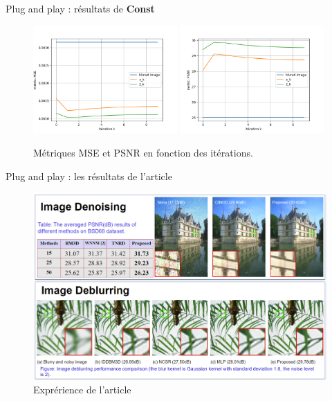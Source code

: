\documentclass[11pt]{beamer}
\begin{document}
\begin{frame}{Plug and play : résultats de \textbf{Const}}
    \begin{figure}[b]
        \centering
        \includegraphics[width=0.49\textwidth]{../images/hqs_constant/MSE.png}
        \includegraphics[width=0.49\textwidth]{../images/hqs_constant/PSNR.png}
        \caption{Métriques MSE et PSNR en fonction des itérations.}
    \end{figure}
\end{frame}

\begin{frame}{Plug and play : les résultats de l'article}
    \begin{figure}[b]
        \centering
        \includegraphics[width=\textwidth]{../paper/experiments.png}
        \caption{Exprérience de l'article}
    \end{figure}
\end{frame}
\end{document}
